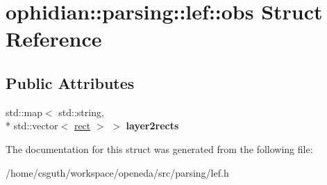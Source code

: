 \hypertarget{structophidian_1_1parsing_1_1lef_1_1obs}{\section{ophidian\-:\-:parsing\-:\-:lef\-:\-:obs Struct Reference}
\label{structophidian_1_1parsing_1_1lef_1_1obs}
}
\subsection*{Public Attributes}
\begin{DoxyCompactItemize}
\item 
\hypertarget{structophidian_1_1parsing_1_1lef_1_1obs_a2f7721937898a158832b575d8a1dad86}{std\-::map$<$ std\-::string, \\*
std\-::vector$<$ \hyperlink{structophidian_1_1parsing_1_1lef_1_1rect}{rect} $>$ $>$ {\bfseries layer2rects}}\label{structophidian_1_1parsing_1_1lef_1_1obs_a2f7721937898a158832b575d8a1dad86}

\end{DoxyCompactItemize}


The documentation for this struct was generated from the following file\-:\begin{DoxyCompactItemize}
\item 
/home/csguth/workspace/openeda/src/parsing/lef.\-h\end{DoxyCompactItemize}
